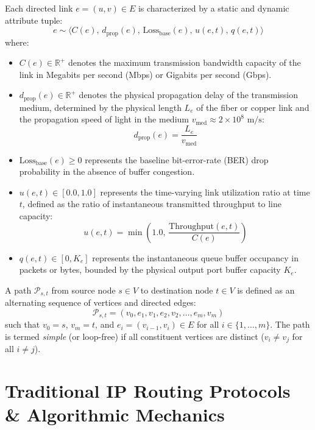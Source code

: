 \documentclass[12pt,a4paper,oneside]{report}
\begin{document}
Each directed link $e = (u, v) \in E$ is characterized by a static and dynamic attribute tuple:
\begin{equation}
    e \sim \langle C(e), \, d_{\text{prop}}(e), \, \text{Loss}_{\text{base}}(e), \, u(e, t), \, q(e, t) \rangle
\end{equation}
where:
\begin{itemize}
    \item $C(e) \in \mathbb{R}^+$ denotes the maximum transmission bandwidth capacity of the link in Megabits per second (Mbps) or Gigabits per second (Gbps).
    \item $d_{\text{prop}}(e) \in \mathbb{R}^+$ denotes the physical propagation delay of the transmission medium, determined by the physical length $L_e$ of the fiber or copper link and the propagation speed of light in the medium $v_{\text{med}} \approx 2 \times 10^8\text{ m/s}$:
    \begin{equation}
        d_{\text{prop}}(e) = \frac{L_e}{v_{\text{med}}}
    \end{equation}
    \item $\text{Loss}_{\text{base}}(e) \ge 0$ represents the baseline bit-error-rate (BER) drop probability in the absence of buffer congestion.
    \item $u(e, t) \in [0.0, 1.0]$ represents the time-varying link utilization ratio at time $t$, defined as the ratio of instantaneous transmitted throughput to line capacity:
    \begin{equation}
        u(e, t) = \min\left(1.0, \, \frac{\text{Throughput}(e, t)}{C(e)}\right)
    \end{equation}
    \item $q(e, t) \in [0, K_e]$ represents the instantaneous queue buffer occupancy in packets or bytes, bounded by the physical output port buffer capacity $K_e$.
\end{itemize}

A path $\mathcal{P}_{s, t}$ from source node $s \in V$ to destination node $t \in V$ is defined as an alternating sequence of vertices and directed edges:
\begin{equation}
    \mathcal{P}_{s, t} = (v_0, e_1, v_1, e_2, v_2, \dots, e_m, v_m)
\end{equation}
such that $v_0 = s$, $v_m = t$, and $e_i = (v_{i-1}, v_i) \in E$ for all $i \in \{1, \dots, m\}$. The path is termed \emph{simple} (or loop-free) if all constituent vertices are distinct ($v_i \ne v_j$ for all $i \ne j$).

\section{Traditional IP Routing Protocols \& Algorithmic Mechanics}
\end{document}
